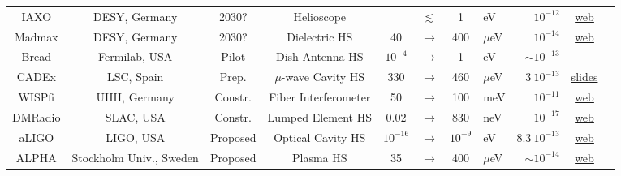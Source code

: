 \begin{table}[!p]
\begin{center}
{\begin{tabular}{ccccccclrcc}

        \rule{0pt}{1ex}
        {\sc IAXO} & DESY, Germany & 2030? & Helioscope & &$\lesssim$ & 1 & eV & $10^{-12}$ & \href{https://iaxo.desy.de/}{web} &\cite{IAXO}
        \\

        \rule{0pt}{1ex}
        {\sc Madmax} & DESY, Germany & 2030? & Dielectric HS & 40 &$\to$ & 400 &$\mu$eV & $10^{-14}$ & \href{https://madmax.mpp.mpg.de/index.html}{web} & \cite{MADMAX}
        \\

        \rule{0pt}{1ex} 
        {\sc Bread} & Fermilab, USA & Pilot & Dish Antenna HS & $10^{-4}$ &$\to$ &1 &eV & $\sim10^{-13}$ & $-$ & \cite{BREAD}
        \\       

        \rule{0pt}{1ex} 
        {\sc CADEx} & LSC, Spain & Prep. & $\mu$-wave Cavity HS & 330 &$\to$ &460 &$\mu$eV & $ 3\ 10^{-13} $ & \href{https://lsc-canfranc.es/wp-content/uploads/2022/01/CADEx_presentation_V0.pdf}{slides} &\cite{CADEx}
        \\

        \rule{0pt}{1ex}
        {\sc WISPfi} & UHH, Germany & Constr. & Fiber Interferometer & 50 &$\to$ & 100 & meV & $ 10^{-11}$ & \href{https://www.physik.uni-hamburg.de/en/iexp/gruppe-horns/forschung.html}{web} & \cite{WISPFI}
        \\

        \rule{0pt}{1ex}
        {\sc DMRadio} & SLAC, USA & Constr. & Lumped Element HS &$0.02$ &$\to$& $830$ &neV & $10^{-17}$  & \href{https://irwinlab.stanford.edu/dark-matter-radio-dm-radio}{web}  & \cite{DMRadio}
        \\

        \rule{0pt}{1ex} 
        {\sc aLIGO} & LIGO, USA & Proposed & Optical Cavity HS & $10^{-16}$ &$\to$ &$10^{-9}$ &eV & $8.3\  10^{-13} $ & \href{https://advancedligo.mit.edu/}{web} & \cite{aLIGO}
        \\

        \rule{0pt}{1ex} 
        {\sc ALPHA} & Stockholm Univ., Sweden & Proposed & Plasma HS & 35 &$\to$ &400 &$\mu$eV & $\sim 10^{-14}$ & \href{https://axiondm.fysik.su.se/alpha/}{web}  & \cite{ALPHA}
        \\


\end{tabular}}
\end{center}
\end{table}
